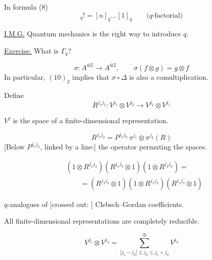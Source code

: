 In formula (8)
\begin{equation*}
[n]_q!=[n]_q\ldots[1]_q\qquad\text{($q$-factorial)}
\tag{11}
\end{equation*}

\underline{I.M.G.} Quantum mechanics is the right way to introduce $q$.

\underline{\underline{Exercise.}} What is $\Gamma_q$?

\begin{equation*}
\sigma\colon A^{\otimes2}\longrightarrow A^{\otimes2},\qquad
\sigma(f\otimes g)=g\otimes f
\tag{12}
\end{equation*}
In particular, $(10)_2$ implies that $\sigma\circ\Delta$ is also a comultiplication.


Define
\begin{equation*}
R^{j_1j_2}\colon V^{j_1}\otimes V^{j_2}\longrightarrow V^{j_2}\otimes V^{j_1}
\end{equation*}

$V^j$ is the space of a finite-dimensional representation.

\begin{equation*}
R^{j_1j_2}=P^{j_1j_2}\,\pi^{j_1}\otimes\pi^{j_2}(R)
\tag{13}
\end{equation*}
[Below $P^{j_1j_2}$, linked by a line:] the operator permuting the spaces.

\begin{equation*}
\begin{aligned}
&(1\otimes R^{j_1j_2})(R^{j_1j_3}\otimes1)(1\otimes R^{j_2j_3})=\\
&\qquad=(R^{j_2j_3}\otimes1)(1\otimes R^{j_1j_3})(R^{j_1j_2}\otimes1)
\end{aligned}
\tag{14}
\end{equation*}

$q$-analogues of [crossed out: ] Clebsch--Gordan coefficients.

All finite-dimensional representations are completely reducible.

\begin{equation*}
V^{j_1}\otimes V^{j_2}=\sum_{|j_1-j_2|\le j_3\le j_1+j_2}^{\oplus}V^{j_3}
\tag{15}
\end{equation*}

